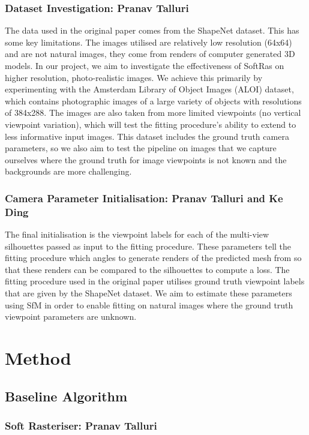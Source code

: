 \documentclass{article}
\begin{document}
\subsubsection{Dataset Investigation: Pranav Talluri}

The data used in the original paper comes from the ShapeNet dataset. This has some key limitations. The images utilised are relatively low resolution (64x64) and are not natural images, they come from renders of computer generated 3D models. In our project, we aim to investigate the effectiveness of SoftRas on higher resolution, photo-realistic images. We achieve this primarily by experimenting with the Amsterdam Library of Object Images (ALOI) \parencite{aloi} dataset, which contains photographic images of a large variety of objects with resolutions of 384x288. The images are also taken from more limited viewpoints (no vertical viewpoint variation), which will test the fitting procedure's ability to extend to less informative input images. This dataset includes the ground truth camera parameters, so we also aim to test the pipeline on images that we capture ourselves where the ground truth for image viewpoints is not known and the backgrounds are more challenging.

\subsubsection{Camera Parameter Initialisation: Pranav Talluri and Ke Ding}

The final initialisation is the viewpoint labels for each of the multi-view silhouettes passed as input to the fitting procedure. These parameters tell the fitting procedure which angles to generate renders of the predicted mesh from so that these renders can be compared to the silhouettes to compute a loss. The fitting procedure used in the original paper utilises ground truth viewpoint labels that are given by the ShapeNet dataset. We aim to estimate these parameters using SfM in order to enable fitting on natural images where the ground truth viewpoint parameters are unknown.

\newpage
\section{Method}
\subsection{Baseline Algorithm}
\subsubsection{Soft Rasteriser: Pranav Talluri}
\label{section:softraspipealgo}
\end{document}
